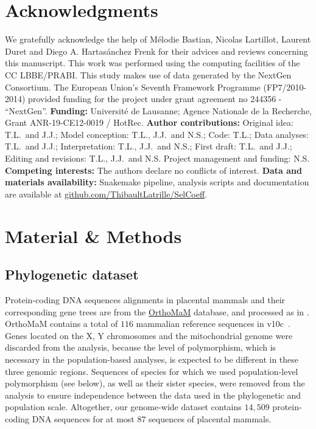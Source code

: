 \documentclass{article}
\begin{document}
    \section*{Acknowledgments}
    \label{sec:acknowledgment}
    We gratefully acknowledge the help of Mélodie Bastian, Nicolas Lartillot, Laurent Duret and Diego A. Hartasánchez Frenk for their advices and reviews concerning this manuscript.
    This work was performed using the computing facilities of the CC LBBE/PRABI\@.
    This study makes use of data generated by the NextGen Consortium.
    The European Union’s Seventh Framework Programme (FP7/2010-2014) provided funding for the project under grant agreement no 244356 - “NextGen”.
    \textbf{Funding:}
    Université de Lausanne; Agence Nationale de la Recherche, Grant ANR-19-CE12-0019 / HotRec.
    \textbf{Author contributions:}
    Original idea: T.L.\ and J.J.;
    Model conception: T.L., J.J.\ and N.S.;
    Code: T.L.;
    Data analyses: T.L.\ and J.J.;
    Interpretation: T.L., J.J.\ and N.S.;
    First draft: T.L.\ and J.J.;
    Editing and revisions: T.L., J.J.\ and N.S.
    Project management and funding: N.S\@.
    \textbf{Competing interests:}
    The authors declare no conflicts of interest.
    \textbf{Data and materials availability:}
    Snakemake pipeline, analysis scripts and documentation are available at \href{https://github.com/ThibaultLatrille/SelCoeff}{github.com/ThibaultLatrille/SelCoeff}.


    \section{Material \& Methods}
    \label{sec:methods}

    \subsection{Phylogenetic dataset}

    Protein-coding DNA sequences alignments in placental mammals and their corresponding gene trees are from the \href{https://www.orthomam.univ-montp2.fr}{OrthoMaM} database, and processed as in \textcite{latrille_genes_2022}.
    OrthoMaM contains a total of $116$ mammalian reference sequences in v10c~\cite{ranwez_orthomam_2007, douzery_orthomam_2014, scornavacca_orthomam_2019}.
    Genes located on the X, Y chromosomes and the mitochondrial genome were discarded from the analysis, because the level of polymorphism, which is necessary in the population-based analyses, is expected to be different in these three genomic regions.
    Sequences of species for which we used population-level polymorphism (see below), as well as their sister species, were removed from the analysis to ensure independence between the data used in the phylogenetic and population scale.
    Altogether, our genome-wide dataset contains $14,509$ protein-coding DNA sequences for at most $87$ sequences of placental mammals.
\end{document}
